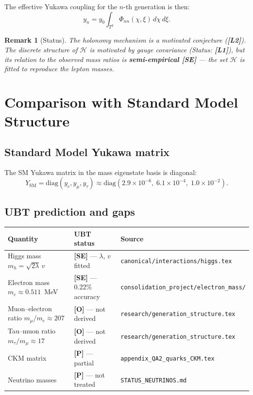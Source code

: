 \documentclass[11pt,a4paper]{article}
\newtheorem{remark}{Remark}
\begin{document}
The effective Yukawa coupling for the $n$-th generation is then:
\begin{equation}
\label{eq:yukawa_holonomy}
  y_n = y_0 \int_{T^2} \Phi_{nn}(\chi,\xi)\, d\chi\, d\xi.
\end{equation}

\begin{remark}[Status]
  The holonomy mechanism is a motivated conjecture (\textbf{[L2]}).
  The discrete structure of $\mathcal{H}$ is motivated by gauge covariance
  (Status: \textbf{[L1]}), but its relation to the observed mass ratios
  is \textbf{semi-empirical [SE]} — the set $\mathcal{H}$ is fitted to
  reproduce the lepton masses.
\end{remark}

\section{Comparison with Standard Model Structure}
\label{sec:sm}

\subsection{Standard Model Yukawa matrix}

The SM Yukawa matrix in the mass eigenstate basis is diagonal:
\begin{equation}
  Y_{\mathrm{SM}} = \mathrm{diag}(y_e, y_\mu, y_\tau)
  \approx \mathrm{diag}(2.9\times10^{-6},\; 6.1\times10^{-4},\; 1.0\times10^{-2}).
\end{equation}

\subsection{UBT prediction and gaps}

\begin{center}
\begin{tabular}{lll}
\hline
Quantity & UBT status & Source \\
\hline
Higgs mass $m_h = \sqrt{2\lambda}\,v$ & \textbf{[SE]} — $\lambda$, $v$ fitted &
  \texttt{canonical/interactions/higgs.tex} \\
Electron mass $m_e \approx 0.511$~MeV & \textbf{[SE]} — 0.22\% accuracy &
  \texttt{consolidation\_project/electron\_mass/} \\
Muon–electron ratio $m_\mu/m_e \approx 207$ & \textbf{[O]} — not derived &
  \texttt{research/generation\_structure.tex} \\
Tau–muon ratio $m_\tau/m_\mu \approx 17$ & \textbf{[O]} — not derived &
  \texttt{research/generation\_structure.tex} \\
CKM matrix & \textbf{[P]} — partial & \texttt{appendix\_QA2\_quarks\_CKM.tex} \\
Neutrino masses & \textbf{[P]} — not treated & \texttt{STATUS\_NEUTRINOS.md} \\
\hline
\end{tabular}
\end{center}
\end{document}
